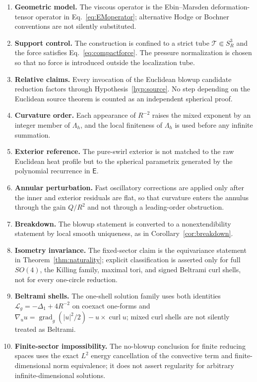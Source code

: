\documentclass[aps,prd,reprint,superscriptaddress,nofootinbib,floatfix]{revtex4-2}
\theoremstyle{definition}
\theoremstyle{remark}
\newcommand{\gradg}{\operatorname{grad}_g}
\newcommand{\cL}{\mathcal{L}}
\begin{document}
\begin{enumerate}[leftmargin=*]
	\item \textbf{Geometric model.}  The viscous operator is the Ebin--Marsden deformation-tensor operator in Eq.~\eqref{eq:EMoperator}; alternative Hodge or Bochner conventions are not silently substituted.
	\item \textbf{Support control.}  The construction is confined to a strict tube $\mathcal T\Subset S^3_R$ and the force satisfies Eq.~\eqref{eq:compactforce}.  The pressure normalization is chosen so that no force is introduced outside the localization tube.
	\item \textbf{Relative claims.}  Every invocation of the Euclidean blowup candidate reduction factors through Hypothesis~\ref{hyp:source}.  No step depending on the Euclidean source theorem is counted as an independent spherical proof.
	\item \textbf{Curvature order.}  Each appearance of $R^{-2}$ raises the mixed exponent by an integer member of $\Lambda_h$, and the local finiteness of $\Lambda_h$ is used before any infinite summation.
	\item \textbf{Exterior reference.}  The pure-swirl exterior is not matched to the raw Euclidean heat profile but to the spherical parametrix generated by the polynomial recurrence in $\mathsf E$.
	\item \textbf{Annular perturbation.}  Fast oscillatory corrections are applied only after the inner and exterior residuals are flat, so that curvature enters the annulus through the gain $Q/R^2$ and not through a leading-order obstruction.
	\item \textbf{Breakdown.}  The blowup statement is converted to a nonextendibility statement by local smooth uniqueness, as in Corollary~\ref{cor:breakdown}.
	\item \textbf{Isometry invariance.}  The fixed-sector claim is the equivariance statement in Theorem~\ref{thm:naturality}; explicit classification is asserted only for full $SO(4)$, the Killing family, maximal tori, and signed Beltrami curl shells, not for every one-circle reduction.
	\item \textbf{Beltrami shells.}  The one-shell solution family uses both identities $\cL_g=-\Delta_1+4R^{-2}$ on coexact one-forms and $\nabla_u u=\gradg(|u|^2/2)-u\times\operatorname{curl}u$; mixed curl shells are not silently treated as Beltrami.
	\item \textbf{Finite-sector impossibility.}  The no-blowup conclusion for finite reducing spaces uses the exact \(L^2\) energy cancellation of the convective term and finite-dimensional norm equivalence; it does not assert regularity for arbitrary infinite-dimensional solutions.

\end{enumerate}
\end{document}
